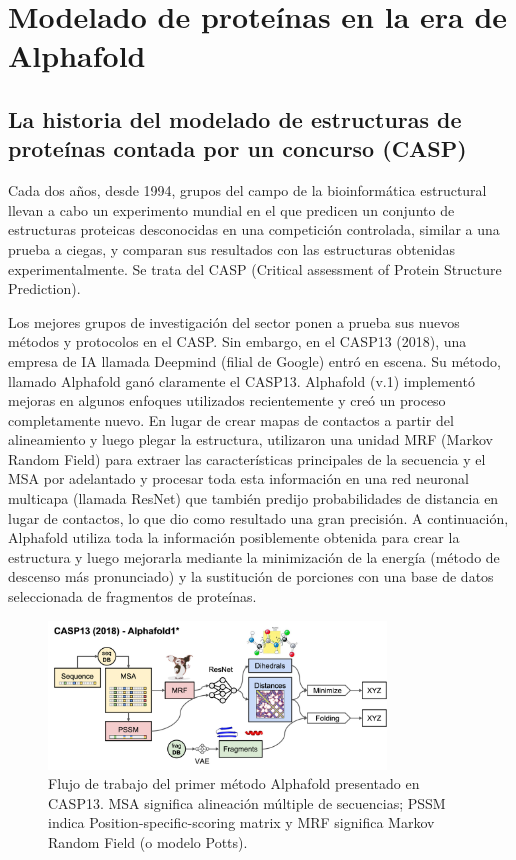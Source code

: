 \chapter{Modelado de proteínas en la era de Alphafold}
\section{La historia del modelado de estructuras de proteínas contada por un concurso (CASP)}
Cada dos años, desde 1994, grupos del campo de la bioinformática estructural llevan a cabo un experimento mundial en el que predicen un conjunto de estructuras proteicas desconocidas en una competición controlada, similar a una prueba a ciegas, y comparan sus resultados con las estructuras obtenidas experimentalmente. Se trata del CASP (Critical assessment of Protein Structure Prediction).

Los mejores grupos de investigación del sector ponen a prueba sus nuevos métodos y protocolos en el CASP. Sin embargo, en el CASP13 (2018), una empresa de IA llamada Deepmind (filial de Google) entró en escena. Su método, llamado Alphafold ganó claramente el CASP13. Alphafold (v.1) implementó mejoras en algunos enfoques utilizados recientemente y creó un proceso completamente nuevo. En lugar de crear mapas de contactos a partir del alineamiento y luego plegar la estructura, utilizaron una unidad MRF (Markov Random Field) para extraer las características principales de la secuencia y el MSA por adelantado y procesar toda esta información en una red neuronal multicapa (llamada ResNet) que también predijo probabilidades de distancia en lugar de contactos, lo que dio como resultado una gran precisión. A continuación, Alphafold utiliza toda la información posiblemente obtenida para crear la estructura y luego mejorarla mediante la minimización de la energía (método de descenso más pronunciado) y la sustitución de porciones con una base de datos seleccionada de fragmentos de proteínas.

\begin{figure}[h]
\centering
\includegraphics[width = 0.8\textwidth]{figs/alphafold1.png}
\caption{Flujo de trabajo del primer método Alphafold presentado en CASP13. MSA significa alineación múltiple de secuencias; PSSM indica Position-specific-scoring matrix y MRF significa Markov Random Field (o modelo Potts).}
\end{figure}

